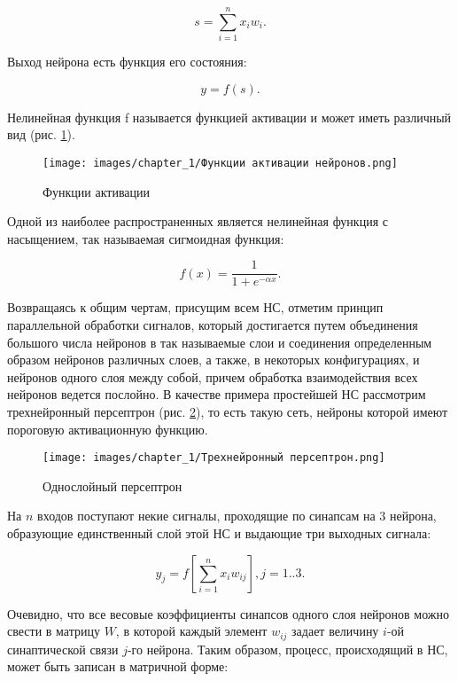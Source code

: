 \begin{equation}
    s = \sum_{i=1}^{n}{x_i w_i}.
\end{equation}

Выход нейрона есть функция его состояния:

\begin{equation}
    y = f(s).
\end{equation}

Нелинейная функция f называется функцией активации и может иметь различный вид (рис. \ref{fig:neuron_activation_functions}).

\begin{figure}[H]
    \centering
    \texttt{[image: images/chapter\_1/Функции активации нейронов.png]}
    \caption{Функции активации}
    \label{fig:neuron_activation_functions}
\end{figure}

Одной из наиболее распространенных является нелинейная функция с насыщением, так называемая сигмоидная функция:

\begin{equation}
    f(x) = \frac{1}{1 + e^{-\alpha x}}.
\end{equation}

Возвращаясь к общим чертам, присущим всем НС, отметим принцип параллельной обработки сигналов, который достигается путем объединения большого числа нейронов в так называемые слои и соединения определенным образом нейронов различных слоев, а также, в некоторых конфигурациях, и нейронов одного слоя между собой, причем обработка взаимодействия всех нейронов ведется послойно. В качестве примера простейшей НС рассмотрим трехнейронный персептрон (рис. \ref{fig:neuron_3x}), то есть такую сеть, нейроны которой имеют пороговую активационную функцию.

\begin{figure}[H]
    \centering
    \texttt{[image: images/chapter\_1/Трехнейронный персептрон.png]}
    \caption{Однослойный персептрон}
    \label{fig:neuron_3x}
\end{figure}

На $n$ входов поступают некие сигналы, проходящие по синапсам на $3$ нейрона, образующие единственный слой этой НС и выдающие три выходных сигнала:

\begin{equation}
    y_j = f\left[\sum_{i=1}^{n}{x_i w_{i j}}\right], j = 1..3.
\end{equation}

Очевидно, что все весовые коэффициенты синапсов одного слоя нейронов можно свести в матрицу $W$, в которой каждый элемент $w_{i j}$ задает величину $i$-ой синаптической связи $j$-го нейрона. Таким образом, процесс, происходящий в НС, может быть записан в матричной форме:

